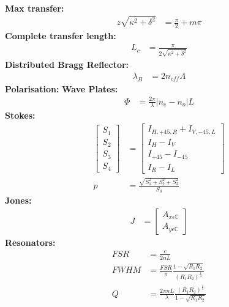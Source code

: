 \documentclass[landscape,a4paper]{article}
\begin{document}
\begin{multicols}{3}
\begin{align}
	\end{align}
	\hspace{3mm}\textbf{Max transfer:}
	\begin{align}
		z\sqrt{\kappa^2 + \delta^2} &= \frac{\pi}{2} + m\pi
	\end{align}
	\hspace{3mm}\textbf{Complete transfer length:}
	\begin{align}
		L_c &= \frac{\pi}{2\sqrt{\kappa^2 + \delta^2}}
	\end{align}
	\hspace{3mm}\textbf{Distributed Bragg Reflector:}
	\begin{align}
		\lambda_B &= 2 n_{eff} \Lambda
	\end{align}
	\textbf{Polarisation:}\newline
	\hspace{3mm}\textbf{Wave Plates:}
	\begin{align}
		\Phi &= \frac{2\pi}{\lambda} |n_e - n_o| L
	\end{align}
	\hspace{3mm}\textbf{Stokes:}
	\begin{align}
		\begin{bmatrix}
			S_1 \\ S_2 \\ S_3 \\ S_4
		\end{bmatrix}
		&=
		\begin{bmatrix}
			I_{H,+45,R} + I_{V,-45,L} \\
			I_H - I_V \\
			I_{+45} - I_{-45} \\
			I_R - I_L
		\end{bmatrix} \\
		p &= \frac{\sqrt{S_1^2 + S_2^2 + S_3^2}}{S_0}
	\end{align}
	\hspace{3mm}\textbf{Jones:}
	\begin{align}
		J &=
		\begin{bmatrix}
			A_{x\epsilon\mathbb{C}} \\ A_{y\epsilon\mathbb{C}}
		\end{bmatrix}
	\end{align}
	\textbf{Resonators:}
	\begin{align}
		FSR &= \frac{c}{2nL}\\
		FWHM &= \frac{FSR}{\pi} \frac{1 - \sqrt{R_1 R_2}}{(R_1 R_2)^\frac{1}{4}}\\
		Q &= \frac{2\pi n L}{\lambda} \frac{(R_1 R_2)^\frac{1}{4}}{1 - \sqrt{R_1 R_2}}\\

\end{align}
\end{multicols}
\end{document}
